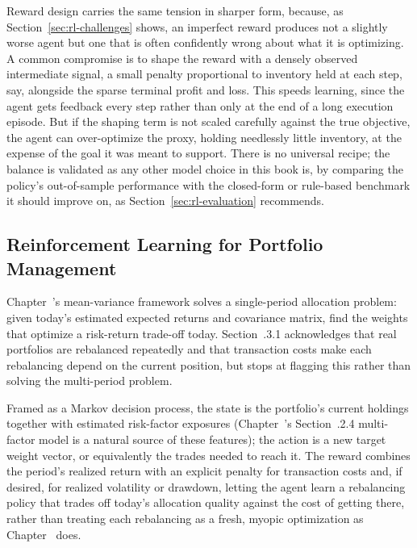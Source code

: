 \documentclass[../ai_in_finance]{subfiles}
\begin{document}
Reward design carries the same tension in sharper form, because, as Section~\ref{sec:rl-challenges} shows, an imperfect reward produces not a slightly worse agent but one that is often confidently wrong about what it is optimizing. A common compromise is to shape the reward with a densely observed intermediate signal, a small penalty proportional to inventory held at each step, say, alongside the sparse terminal profit and loss. This speeds learning, since the agent gets feedback every step rather than only at the end of a long execution episode. But if the shaping term is not scaled carefully against the true objective, the agent can over-optimize the proxy, holding needlessly little inventory, at the expense of the goal it was meant to support. There is no universal recipe; the balance is validated as any other model choice in this book is, by comparing the policy's out-of-sample performance with the closed-form or rule-based benchmark it should improve on, as Section~\ref{sec:rl-evaluation} recommends.

\subsection{Reinforcement Learning for Portfolio Management}
\label{sec:rl-portfolio}

Chapter~'s mean-variance framework solves a single-period allocation problem: given today's estimated expected returns and covariance matrix, find the weights that optimize a risk-return trade-off today. Section~.3.1 acknowledges that real portfolios are rebalanced repeatedly and that transaction costs make each rebalancing depend on the current position, but stops at flagging this rather than solving the multi-period problem.

Framed as a Markov decision process, the state is the portfolio's current holdings together with estimated risk-factor exposures (Chapter~'s Section~.2.4 multi-factor model is a natural source of these features); the action is a new target weight vector, or equivalently the trades needed to reach it. The reward combines the period's realized return with an explicit penalty for transaction costs and, if desired, for realized volatility or drawdown, letting the agent learn a rebalancing policy that trades off today's allocation quality against the cost of getting there, rather than treating each rebalancing as a fresh, myopic optimization as Chapter~ does.
\end{document}
